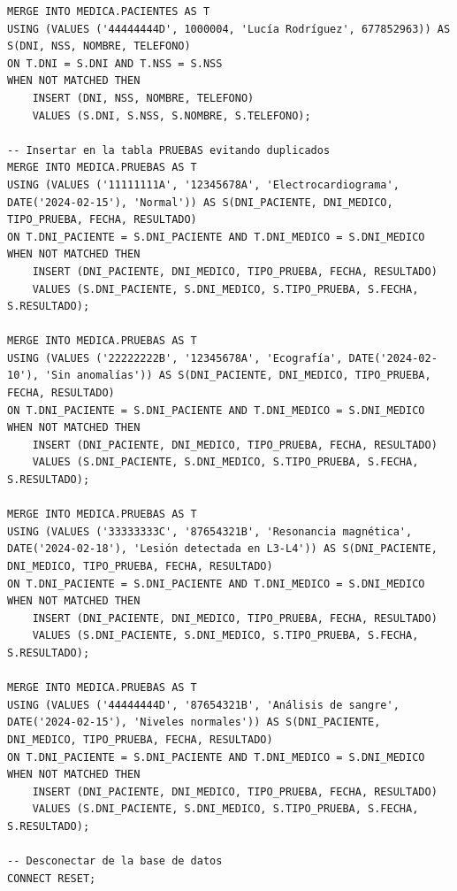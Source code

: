 \documentclass{article}
\begin{document}
\begin{verbatim}
MERGE INTO MEDICA.PACIENTES AS T
USING (VALUES ('44444444D', 1000004, 'Lucía Rodríguez', 677852963)) AS S(DNI, NSS, NOMBRE, TELEFONO)
ON T.DNI = S.DNI AND T.NSS = S.NSS
WHEN NOT MATCHED THEN
    INSERT (DNI, NSS, NOMBRE, TELEFONO)
    VALUES (S.DNI, S.NSS, S.NOMBRE, S.TELEFONO);

-- Insertar en la tabla PRUEBAS evitando duplicados
MERGE INTO MEDICA.PRUEBAS AS T
USING (VALUES ('11111111A', '12345678A', 'Electrocardiograma', DATE('2024-02-15'), 'Normal')) AS S(DNI_PACIENTE, DNI_MEDICO, TIPO_PRUEBA, FECHA, RESULTADO)
ON T.DNI_PACIENTE = S.DNI_PACIENTE AND T.DNI_MEDICO = S.DNI_MEDICO
WHEN NOT MATCHED THEN
    INSERT (DNI_PACIENTE, DNI_MEDICO, TIPO_PRUEBA, FECHA, RESULTADO)
    VALUES (S.DNI_PACIENTE, S.DNI_MEDICO, S.TIPO_PRUEBA, S.FECHA, S.RESULTADO);

MERGE INTO MEDICA.PRUEBAS AS T
USING (VALUES ('22222222B', '12345678A', 'Ecografía', DATE('2024-02-10'), 'Sin anomalías')) AS S(DNI_PACIENTE, DNI_MEDICO, TIPO_PRUEBA, FECHA, RESULTADO)
ON T.DNI_PACIENTE = S.DNI_PACIENTE AND T.DNI_MEDICO = S.DNI_MEDICO
WHEN NOT MATCHED THEN
    INSERT (DNI_PACIENTE, DNI_MEDICO, TIPO_PRUEBA, FECHA, RESULTADO)
    VALUES (S.DNI_PACIENTE, S.DNI_MEDICO, S.TIPO_PRUEBA, S.FECHA, S.RESULTADO);

MERGE INTO MEDICA.PRUEBAS AS T
USING (VALUES ('33333333C', '87654321B', 'Resonancia magnética', DATE('2024-02-18'), 'Lesión detectada en L3-L4')) AS S(DNI_PACIENTE, DNI_MEDICO, TIPO_PRUEBA, FECHA, RESULTADO)
ON T.DNI_PACIENTE = S.DNI_PACIENTE AND T.DNI_MEDICO = S.DNI_MEDICO
WHEN NOT MATCHED THEN
    INSERT (DNI_PACIENTE, DNI_MEDICO, TIPO_PRUEBA, FECHA, RESULTADO)
    VALUES (S.DNI_PACIENTE, S.DNI_MEDICO, S.TIPO_PRUEBA, S.FECHA, S.RESULTADO);

MERGE INTO MEDICA.PRUEBAS AS T
USING (VALUES ('44444444D', '87654321B', 'Análisis de sangre', DATE('2024-02-15'), 'Niveles normales')) AS S(DNI_PACIENTE, DNI_MEDICO, TIPO_PRUEBA, FECHA, RESULTADO)
ON T.DNI_PACIENTE = S.DNI_PACIENTE AND T.DNI_MEDICO = S.DNI_MEDICO
WHEN NOT MATCHED THEN
    INSERT (DNI_PACIENTE, DNI_MEDICO, TIPO_PRUEBA, FECHA, RESULTADO)
    VALUES (S.DNI_PACIENTE, S.DNI_MEDICO, S.TIPO_PRUEBA, S.FECHA, S.RESULTADO);

-- Desconectar de la base de datos
CONNECT RESET;
\end{verbatim}
\end{document}
